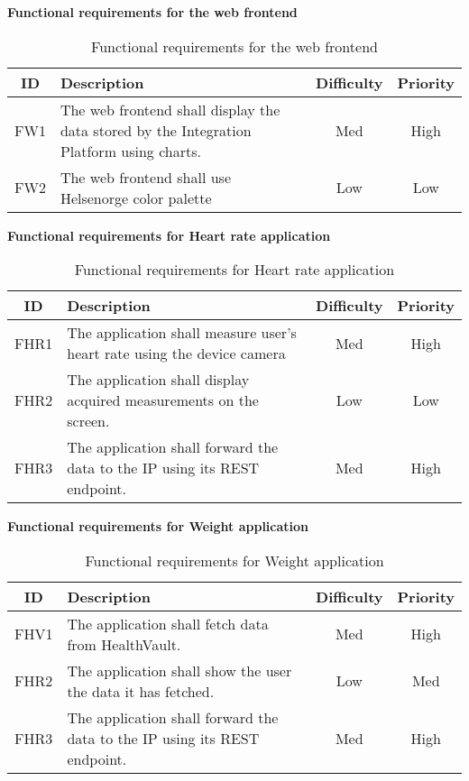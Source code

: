 \textbf{Functional requirements for the web frontend}

\begin{table}[h]
\begin{center}
\begin{tabular}{ | c | p{9cm} | c | c |}
  \hline
  ID & Description & Difficulty & Priority\\
  \hline\noalign{\smallskip}\noalign{\smallskip}\hline
  FW1	& The web frontend shall display the data stored by the Integration Platform using charts.	& Med	& High \\
  FW2	& The web frontend shall use Helsenorge color palette										& Low	& Low \\
  \hline
\end{tabular}
\end{center}
\caption{Functional requirements for the web frontend}
\label{table:reqfrontend}
\end{table}

\textbf{Functional requirements for Heart rate application}

\begin{table}[h]
\begin{center}
\begin{tabular}{ | c | p{9cm} | c | c |}
  \hline
  ID & Description & Difficulty & Priority\\
  \hline\noalign{\smallskip}\noalign{\smallskip}\hline
  FHR1	& The application shall measure user’s heart rate using the device camera	& Med	& High \\
  FHR2	& The application shall display acquired measurements on the screen.		& Low	& Low \\
  FHR3	& The application shall forward the data to the IP using its REST endpoint. & Med	& High \\
  \hline
\end{tabular}
\end{center}
\caption{Functional requirements for Heart rate application}
\label{table:reqfrontend}
\end{table}

\textbf{Functional requirements for Weight application}

\begin{table}[h]
\begin{center}
\begin{tabular}{ | c | p{9cm} | c | c |}
  \hline
  ID & Description & Difficulty & Priority\\
  \hline\noalign{\smallskip}\noalign{\smallskip}\hline
  FHV1	& The application shall fetch data from HealthVault.						& Med	& High \\
  FHR2	& The application shall show the user the data it has fetched.				& Low	& Med \\
  FHR3	& The application shall forward the data to the IP using its REST endpoint. & Med	& High \\
  \hline
\end{tabular}
\end{center}
\caption{Functional requirements for Weight application}
\label{table:reqfrontend}
\end{table}


